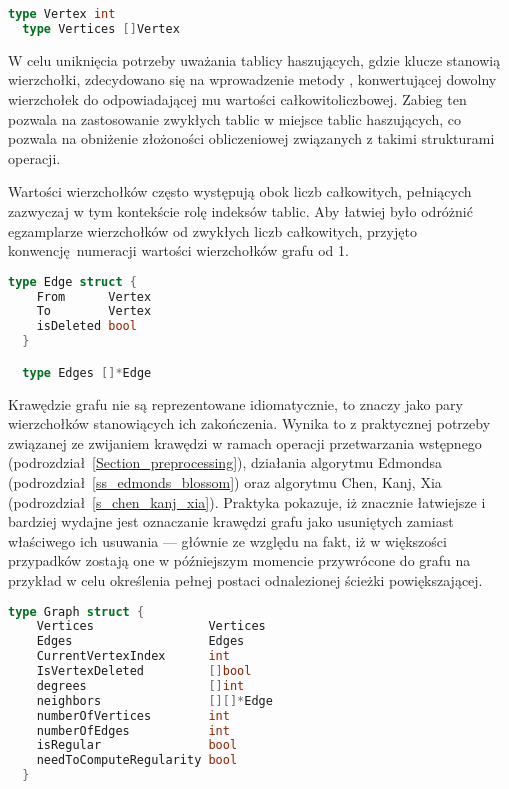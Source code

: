 \par{
  \begin{lstlisting}[language=go, caption=Typy reprezentujące wierzchołki grafu.]
  type Vertex int
  type Vertices []Vertex
  \end{lstlisting}
  W celu uniknięcia potrzeby uważania tablicy haszujących, gdzie klucze stanowią wierzchołki, zdecydowano się na wprowadzenie metody , konwertującej dowolny wierzchołek do odpowiadającej mu wartości całkowitoliczbowej.
  Zabieg ten pozwala na zastosowanie zwykłych tablic w miejsce tablic haszujących, co pozwala na obniżenie złożoności obliczeniowej związanych z takimi strukturami operacji.

  Wartości wierzchołków często występują obok liczb całkowitych, pełniących zazwyczaj w tym kontekście rolę indeksów tablic.
  Aby łatwiej było odróżnić egzamplarze wierzchołków od zwykłych liczb całkowitych, przyjęto konwencję numeracji wartości wierzchołków grafu od 1.
  \begin{lstlisting}[language=go, caption=Typy reprezentujące krawędzie grafu.]
  type Edge struct {
    From      Vertex
    To        Vertex
    isDeleted bool
  }

  type Edges []*Edge
  \end{lstlisting}

  Krawędzie grafu nie są reprezentowane idiomatycznie, to znaczy jako pary wierzchołków stanowiących ich zakończenia.
  Wynika to z praktycznej potrzeby związanej ze zwijaniem krawędzi w ramach operacji przetwarzania wstępnego (podrozdział~\ref{Section_preprocessing}), działania algorytmu Edmondsa (podrozdział~\ref{ss_edmonds_blossom}) oraz algorytmu Chen, Kanj, Xia (podrozdział~\ref{s_chen_kanj_xia}).
  Praktyka pokazuje, iż znacznie łatwiejsze i bardziej wydajne jest oznaczanie krawędzi grafu jako usuniętych zamiast właściwego ich usuwania --- głównie ze względu na fakt, iż w większości przypadków zostają one w późniejszym momencie przywrócone do grafu na przykład w celu określenia pełnej postaci odnalezionej ścieżki powiększającej.

  \begin{lstlisting}[language=go, caption=Struktura reprezentująca graf.]
  type Graph struct {
    Vertices                Vertices
    Edges                   Edges
    CurrentVertexIndex      int
    IsVertexDeleted         []bool
    degrees                 []int
    neighbors               [][]*Edge
    numberOfVertices        int
    numberOfEdges           int
    isRegular               bool
    needToComputeRegularity bool
  }
  \end{lstlisting}

}
